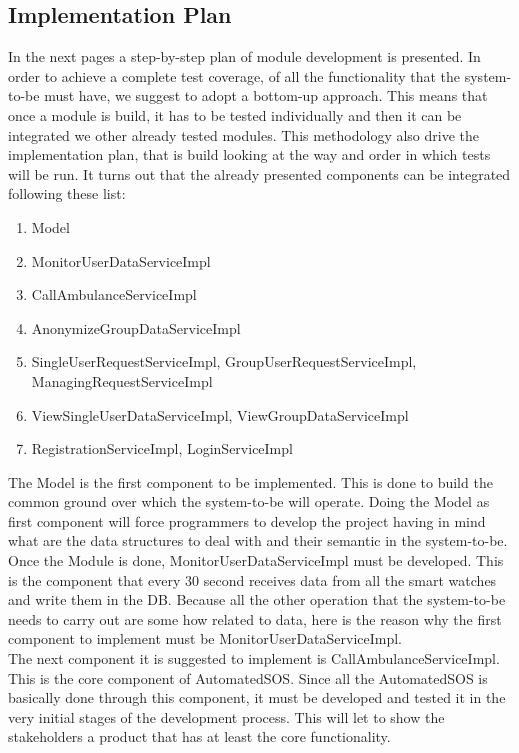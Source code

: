 \documentclass{article}
\begin{document}
\subsection{Implementation Plan}
In the next pages a step-by-step plan of module development is presented. In order to achieve a complete test coverage, of all the functionality that the system-to-be must have, we suggest to adopt a bottom-up approach. This means that once a module is build, it has to be tested individually and then it can be integrated we other already tested modules. This methodology also drive the implementation plan, that is build looking at the way and order in which tests will be run. It turns out that the already presented components can be integrated following these list: 
\begin{enumerate}
\item Model 
\item MonitorUserDataServiceImpl
\item CallAmbulanceServiceImpl
\item AnonymizeGroupDataServiceImpl
\item SingleUserRequestServiceImpl, GroupUserRequestServiceImpl, ManagingRequestServiceImpl
\item ViewSingleUserDataServiceImpl, ViewGroupDataServiceImpl
\item RegistrationServiceImpl, LoginServiceImpl
\end{enumerate}
The Model is the first component to be implemented. This is done to build the common ground over which the system-to-be will operate. Doing the Model as first component will force programmers to develop the project having in mind what are the data structures to deal with and their semantic in the system-to-be. \\
Once the Module is done, MonitorUserDataServiceImpl must be developed. This is the component that every 30 second receives data from all the smart watches and write them in the DB. Because all the other operation that the system-to-be needs to carry out are some how related to data, here is the reason why the first component to implement must be MonitorUserDataServiceImpl. \\
The next component it is suggested to implement is CallAmbulanceServiceImpl. This is the core component of AutomatedSOS. Since all the AutomatedSOS is basically done through this component, it must be developed and tested it in the very initial stages of the development process. This will let to show the stakeholders a product that has at least the core functionality. \\
\end{document}
